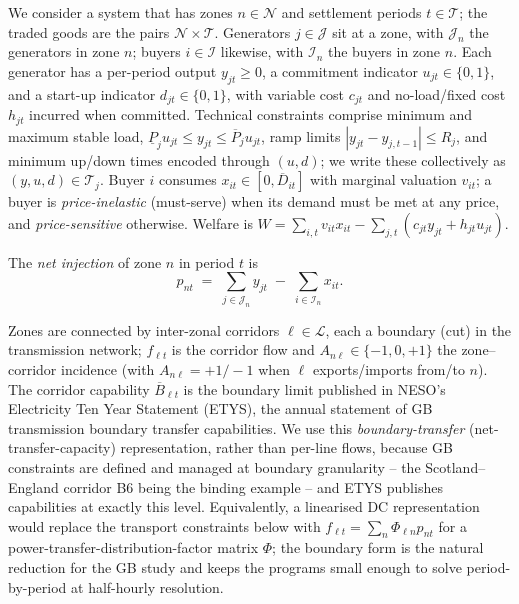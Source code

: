 \documentclass[review,3p,times]{elsarticle}
\theoremstyle{plain}
\theoremstyle{definition}
\begin{document}
We consider a system that has zones
$n\in\mathcal N$ and settlement periods $t\in\mathcal T$; the traded goods are
the pairs $\mathcal N\times\mathcal T$. Generators $j\in\mathcal J$ sit at a zone,
with $\mathcal J_n$ the generators in zone $n$; buyers $i\in\mathcal I$ likewise,
with $\mathcal I_n$ the buyers in zone $n$. Each generator has a per-period
output $y_{jt}\ge 0$, a commitment indicator $u_{jt}\in\{0,1\}$, and a start-up
indicator $d_{jt}\in\{0,1\}$, with variable cost $c_{jt}$ and no-load/fixed cost
$h_{jt}$ incurred when committed. Technical constraints comprise minimum and
maximum stable load, $\underline P_j u_{jt}\le y_{jt}\le\overline P_j u_{jt}$,
ramp limits $|y_{jt}-y_{j,t-1}|\le R_j$, and minimum up/down times encoded
through $(u,d)$; we write these collectively as $(y,u,d)\in\mathcal T_j$. Buyer
$i$ consumes $x_{it}\in[0,\overline D_{it}]$ with marginal valuation $v_{it}$; a
buyer is \emph{price-inelastic} (must-serve) when its demand must be met at any
price, and \emph{price-sensitive} otherwise. Welfare is
$W=\sum_{i,t}v_{it}x_{it}-\sum_{j,t}(c_{jt}y_{jt}+h_{jt}u_{jt})$.

The \emph{net injection} of zone $n$ in period $t$ is
\begin{equation}
p_{nt}\;=\;\sum_{j\in\mathcal J_n} y_{jt}\;-\;\sum_{i\in\mathcal I_n} x_{it}.
\label{eq:netinj}
\end{equation}

Zones are connected by inter-zonal corridors $\ell\in\mathcal L$, each a boundary
(cut) in the transmission network; $f_{\ell t}$ is the corridor flow and
$A_{n\ell}\in\{-1,0,+1\}$ the zone--corridor incidence (with $A_{n\ell}=+1/-1$ when
$\ell$ exports/imports from/to $n$). The corridor capability $\overline B_{\ell t}$ is the
boundary limit published in NESO's Electricity Ten Year Statement (ETYS), the
annual statement of GB transmission boundary transfer capabilities. We use this
\emph{boundary-transfer} (net-transfer-capacity)
representation, rather than per-line flows, because GB constraints are defined
and managed at boundary granularity -- the Scotland--England corridor B6 being the
binding example -- and ETYS publishes capabilities at exactly this level.
Equivalently, a linearised DC representation would replace the transport
constraints below with $f_{\ell t}=\sum_n\Phi_{\ell n}p_{nt}$ for a
power-transfer-distribution-factor matrix $\Phi$; the boundary form is the
natural reduction for the GB study and keeps the programs small enough to solve
period-by-period at half-hourly resolution.
\end{document}
